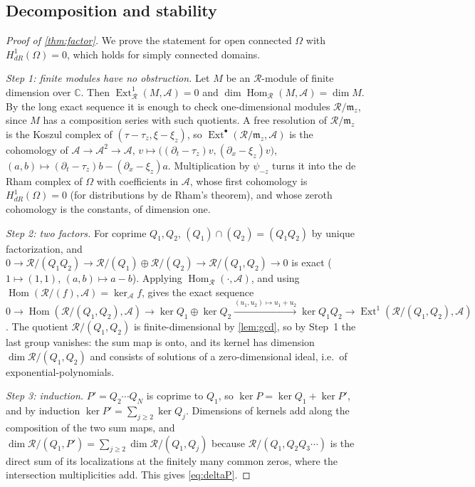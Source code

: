 \documentclass[11pt]{article}
\theoremstyle{plain}
\theoremstyle{definition}
\theoremstyle{remark}
\newcommand{\C}{\mathbb{C}}
\newcommand{\ring}{\mathcal{R}}            %
\begin{document}
\subsection{Decomposition and stability}
\begin{proof}[Proof of \cref{thm:factor}]
We prove the statement for open connected $\Omega$ with $H^1_{dR}(\Omega)=0$, which holds for simply connected domains.

\emph{Step 1: finite modules have no obstruction.} Let $M$ be an $\ring$-module of finite dimension over $\C$. Then
$\operatorname{Ext}^1_\ring(M,\mathcal A)=0$ and $\dim\operatorname{Hom}_\ring(M,\mathcal A)=\dim M$. By the long exact sequence it is
enough to check one-dimensional modules $\ring/\mathfrak m_z$, since $M$ has a composition series with such
quotients. A free resolution of $\ring/\mathfrak m_z$ is the Koszul complex of $(\tau-\tau_z,\xi-\xi_z)$, so
$\operatorname{Ext}^\bullet(\ring/\mathfrak m_z,\mathcal A)$ is the cohomology of
$\mathcal A\to\mathcal A^2\to\mathcal A$, $v\mapsto\big((\partial_t-\tau_z)v,(\partial_x-\xi_z)v\big)$, $(a,b)\mapsto(\partial_t-\tau_z)b-(\partial_x-\xi_z)a$.
Multiplication by $\psi_{-z}$ turns it into the de Rham complex of $\Omega$ with coefficients in $\mathcal A$, whose first
cohomology is $H^1_{dR}(\Omega)=0$ (for distributions by de Rham's theorem), and whose zeroth cohomology is the constants,
of dimension one.

\emph{Step 2: two factors.} For coprime $Q_1,Q_2$, $(Q_1)\cap(Q_2)=(Q_1Q_2)$ by unique factorization, and
$0\to\ring/(Q_1Q_2)\to\ring/(Q_1)\oplus\ring/(Q_2)\to\ring/(Q_1,Q_2)\to0$ is exact ($1\mapsto(1,1)$, $(a,b)\mapsto a-b$).
Applying $\operatorname{Hom}_\ring(\cdot,\mathcal A)$, and using $\operatorname{Hom}(\ring/(f),\mathcal A)=\ker_{\mathcal A}f$,
gives the exact sequence
$0\to\operatorname{Hom}(\ring/(Q_1,Q_2),\mathcal A)\to\ker Q_1\oplus\ker Q_2\xrightarrow{(u_1,u_2)\mapsto u_1+u_2}\ker Q_1Q_2\to
\operatorname{Ext}^1(\ring/(Q_1,Q_2),\mathcal A)$. The quotient $\ring/(Q_1,Q_2)$ is finite-dimensional by
\cref{lem:gcd}, so by Step~1 the last group vanishes: the sum map is onto, and its kernel has dimension
$\dim\ring/(Q_1,Q_2)$ and consists of solutions of a zero-dimensional ideal, i.e.\ of exponential-polynomials.

\emph{Step 3: induction.} $P'=Q_2\cdots Q_N$ is coprime to $Q_1$, so $\ker P=\ker Q_1+\ker P'$, and by induction
$\ker P'=\sum_{j\ge2}\ker Q_j$. Dimensions of kernels add along the composition of the two sum maps, and
$\dim\ring/(Q_1,P')=\sum_{j\ge2}\dim\ring/(Q_1,Q_j)$ because $\ring/(Q_1,Q_2Q_3\cdots)$ is the direct sum of its
localizations at the finitely many common zeros, where the intersection multiplicities add. This gives
\eqref{eq:deltaP}.
\end{proof}
\end{document}
